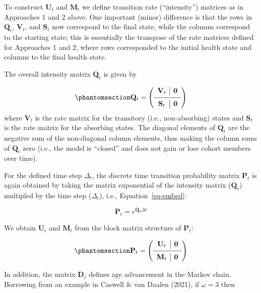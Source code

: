 \documentclass[
]{agujournal2019}
\begin{document}
To construct \(\mathbf{U}_t\) and \(\mathbf{M}_t\) we define transition
rate (``intensity'') matrices as in Approaches 1 and 2 above. One
important (minor) difference is that the rows in \(\mathbf{Q}_t\),
\(\mathbf{V}_t\), and \(\mathbf{S}_t\) now correspond to the final
state, while the columns correspond to the starting state; this is
essentially the transpose of the rate matrices defined for Approaches 1
and 2, where rows corresponded to the initial health state and columns
to the final health state.

The overall intensity matrix \(\mathbf{Q}_t\) is given by

\begin{equation}\phantomsection\label{eq-Qx}{
\mathbf{Q}_t=\left(\begin{array}{c|c}
\mathbf{V}_t & \mathbf{0} \\
\hline \mathbf{S}_t  & \mathbf{0}
\end{array}\right)
}\end{equation} where \(\mathbf{V}_t\) is the rate matrix for the
transitory (i.e., non-absorbing) states and \(\mathbf{S}_t\) is the rate
matrix for the absorbing states. The diagonal elements of
\(\mathbf{Q}_t\) are the negative sum of the non-diagonal column
elements, thus making the column sums of \(\mathbf{Q}_t\) zero (i.e.,
the model is ``closed'' and does not gain or lose cohort members over
time).

For the defined time step \(\Delta_t\), the discrete time transition
probability matrix \(\mathbf{P}_t\) is again obtained by taking the
matrix exponential of the intensity matrix (\(\mathbf{Q}_t\)) multipled
by the time step (\(\Delta_t\)), i.e., Equation~\ref{eq-embed}:

\[
\mathbf{P}_t =e^{\mathbf{Q}_t  \Delta t}
\]

We obtain \(\mathbf{U}_t\) and \(\mathbf{M}_t\) from the block matrix
structure of \(\mathbf{P}_t\):

\begin{equation}\phantomsection\label{eq-P3}{
\mathbf{P}_t =\left(\begin{array}{c|c}
\mathbf{U}_t  & \mathbf{0} \\
\hline \mathbf{M}_t  & \mathbf{0}
\end{array}\right)
}\end{equation}

In addition, the matrix \(\mathbf{D}_j\) defines age advancement in the
Markov chain. Borrowing from an example in Caswell \& van Daalen (2021),
if \(\omega=3\) then
\end{document}
